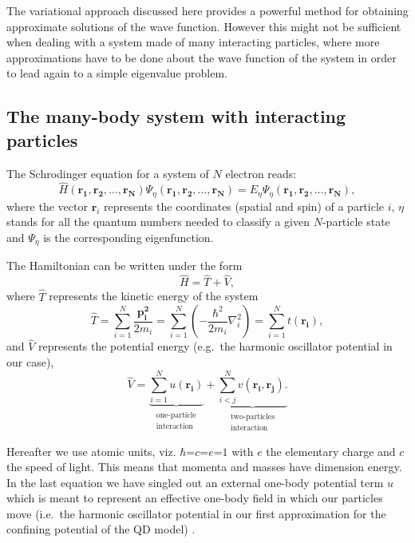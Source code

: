 The variational approach discussed here provides a powerful method for obtaining approximate solutions of the wave function. However this might not be sufficient when dealing with a system made of many interacting particles, where more approximations have to be done about the wave function of the system in order to lead again to a simple eigenvalue problem.

\subsection{The many-body system with interacting particles}
\label{SlaterDet}

The Schrodinger equation for a system of $N$ electron reads:
\begin{equation}
  \hat{H}(\mathbf{r_1},\mathbf{r_2},\dots, \mathbf{r_N}) \Psi_\eta (\mathbf{r_1},\mathbf{r_2},\dots, \mathbf{r_N})=E_\eta \Psi_\eta (\mathbf{r_1},\mathbf{r_2},\dots, \mathbf{r_N}),
\end{equation}
where the vector $\mathbf{r}_i$ represents the coordinates (spatial and spin) of a particle $i$, $\eta$ stands for all the quantum numbers needed to classify a given $N$-particle state and $\Psi_\eta$ is the corresponding eigenfunction.

The Hamiltonian can be written under the form
\[
 \hat{H}= \hat{T}+ \hat{V},
\]
where $\hat{T}$ represents the kinetic energy of the system
 \begin{equation}
\nonumber
 \hat{T}=\sum_{i=1}^{N}\frac{\mathbf{p_i^2}}{2m_i}=\sum_{i=1}^{N}\left( -\frac{\hbar^2}{2m_i}\nabla_i^2 \right)=\sum_{i=1}^{N} t(\mathbf{r_i}),
 \end{equation}
and $\hat{V}$ represents the potential energy (e.g.\ the harmonic oscillator potential in our case),
 \begin{equation}
\label{eq:potentialHamiltonian}
 \hat{V}= \underbrace{\sum_{i=1}^{N} u(\mathbf{r_i})}_{\begin{smallmatrix}  \text{one-particle} \\  \text{interaction} \end{smallmatrix}}
 +\underbrace{\sum_{i<j}^{N}v(\mathbf{r_i},\mathbf{r_j}).}_{\begin{smallmatrix}  \text{two-particles} \\  \text{interaction} \end{smallmatrix}}
\end{equation}

Hereafter we use atomic units, viz. $\hbar$=$c$=$e$=$1$ with $e$ the elementary charge and $c$ the speed of light. This means that momenta and masses have dimension energy. In the last equation we have singled out an external one-body potential term $u$ which is meant to represent an effective one-body field in which our particles move (i.e.\ the harmonic oscillator potential in our first approximation for the confining potential of the QD model) .

